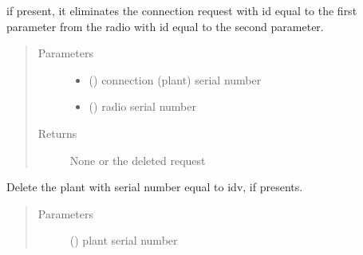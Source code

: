 \documentclass[letterpaper,10pt,english]{sphinxmanual}
\begin{document}
\begin{fulllineitems}
\label{\detokenize{index:controller.utility.delete_conn_req}}
if present, it eliminates the connection request with id equal to the first parameter
from the radio with id equal to the second parameter.
\begin{quote}\begin{description}
\item[{Parameters}] \leavevmode\begin{itemize}
\item {} 
 () \textendash{} connection (plant) serial number

\item {} 
 () \textendash{} radio serial number

\end{itemize}

\item[{Returns}] \leavevmode
None or the deleted request

\end{description}\end{quote}

\end{fulllineitems}


\begin{fulllineitems}
\label{\detokenize{index:controller.utility.delete_plant}}
Delete the plant with serial number equal to idv, if presents.
\begin{quote}\begin{description}
\item[{Parameters}] \leavevmode
{} () \textendash{} plant serial number

\end{description}\end{quote}

\end{fulllineitems}
\end{document}

